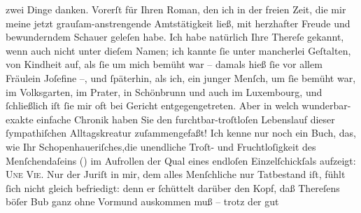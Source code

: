 \begin{ledgroupsized}[t]{13cm}
               zwei Dinge danken.\pend
           \pstart
           Vorerſt für Ihren Roman, den
               ich in der freien Zeit, die mir meine jetzt grauſam-anstrengende Amtstätigkeit ließ,
               mit herzhafter Freude und bewunderndem Schauer geleſen habe. {\pb}Ich habe natürlich Ihre Thereſe gekannt,
               wenn auch nicht unter dieſem Namen; ich kannte ſie unter mancherlei Geſtalten, von
               Kindheit auf, als ſie um mich bemüht war – damals hieß ſie vor allem Fräulein
               Joſefine –, und ſpäterhin, als ich, ein junger Menſch, um ſie bemüht war, im Volksgarten, im Prater, in Schönbrunn und auch im Luxembourg, und ſchließlich iſt ſie mir oft bei
               Gericht entgegengetreten. Aber in welch wunderbar-exakte einfache Chronik haben Sie
               den furchtbar-troſtloſen Lebenslauf dieser ſympathiſchen Alltagskreatur
               zuſammengefaßt! Ich kenne nur noch ein Buch, das, wie Ihr Schopenhaueriſches,die unendliche Troſt- und Fruchtloſigkeit
               des Menſchendaſeins (\textsc{\label{K_L02500-1v}\label{K_L02500-1h}}) im Aufrollen der Qual eines endloſen Einzelſchickſals aufzeigt: \textsc{Une Vie}.\pend
           \pstart
           {\pb}Nur der Juriſt in mir, dem alles
               Menſchliche nur Tatbestand iſt, fühlt ſich nicht gleich befriedigt: denn er ſchüttelt
               darüber den Kopf, daß Thereſens böſer Bub ganz ohne Vormund auskommen muß – trotz der gut

\end{ledgroupsized}
